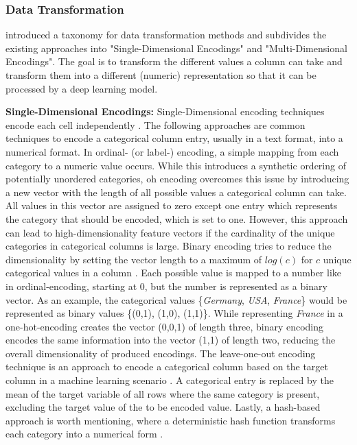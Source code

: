 \subsubsection{Data Transformation}
\label{sec:dataTransformation}

\textcite[p. 5]{borisov2022DeepNeuralNetworks} introduced a taxonomy for data transformation methods and subdivides the existing approaches into "Single-Dimensional Encodings" and "Multi-Dimensional Encodings".
The goal is to transform the different values a column can take and transform them into a different (numeric) representation so that it can be processed by a deep learning \gls{model}.

\textbf{Single-Dimensional Encodings:}
Single-Dimensional encoding techniques encode each cell independently \cite{borisov2022DeepNeuralNetworks}.
The following approaches are common techniques to encode a categorical column entry, usually in a text format, into a numerical format.
In ordinal- (or label-) encoding, a simple mapping from each category to a numeric value occurs. 
While this introduces a synthetic ordering of potentially unordered categories, \gls{oh} encoding overcomes this issue by introducing a new vector with the length of all possible values a categorical column can take.
All values in this vector are assigned to zero except one entry which represents the category that should be encoded, which is set to one.
However, this approach can lead to high-dimensionality feature vectors if the cardinality of the unique categories in categorical columns is large.
Binary encoding tries to reduce the dimensionality by setting the vector length to a maximum of $log(c)$ for $c$ unique categorical values in a column \cite{borisov2022DeepNeuralNetworks}.
Each possible value is mapped to a number like in ordinal-encoding, starting at 0, but the number is represented as a binary vector.
As an example, the categorical values \{\textit{Germany}, \textit{USA}, \textit{France}\} would be represented as binary values \{(0,1), (1,0), (1,1)\}. 
While representing \textit{France} in a one-hot-encoding creates the vector (0,0,1) of length three, binary encoding encodes the same information into the vector (1,1) of length two, reducing the overall dimensionality of produced encodings.
The leave-one-out encoding technique is an approach to encode a categorical column based on the target column in a machine learning scenario \cite{borisov2022DeepNeuralNetworks}. 
A categorical entry is replaced by the mean of the target variable of all rows where the same category is present, excluding the target value of the to be encoded value.
Lastly, a hash-based approach is worth mentioning, where a deterministic hash function transforms each category into a numerical form \cite{borisov2022DeepNeuralNetworks}.

